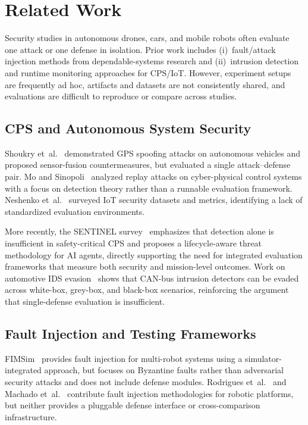 \section{Related Work} \label{sec:related}

Security studies in autonomous drones, cars, and mobile robots often
evaluate one attack or one defense in isolation.  Prior work includes
(i)~fault/attack injection methods from dependable-systems research and
(ii)~intrusion detection and runtime monitoring approaches for CPS/IoT.
However, experiment setups are frequently ad hoc, artifacts and datasets
are not consistently shared, and evaluations are difficult to reproduce
or compare across studies.

\subsection{CPS and Autonomous System Security}

Shoukry et~al.~\cite{shoukry2013} demonstrated GPS spoofing attacks on
autonomous vehicles and proposed sensor-fusion countermeasures, but
evaluated a single attack--defense pair.  Mo and Sinopoli~\cite{mo2009}
analyzed replay attacks on cyber-physical control systems with a focus on
detection theory rather than a runnable evaluation framework.
Neshenko et~al.~\cite{neshenko2019} surveyed IoT security datasets and
metrics, identifying a lack of standardized evaluation environments.

More recently, the SENTINEL survey~\cite{sentinel2026} emphasizes that
detection alone is insufficient in safety-critical CPS and proposes a
lifecycle-aware threat methodology for AI agents, directly supporting
the need for integrated evaluation frameworks that measure both security
and mission-level outcomes.  Work on automotive IDS
evasion~\cite{autoids2025} shows that CAN-bus intrusion detectors can be
evaded across white-box, grey-box, and black-box scenarios, reinforcing
the argument that single-defense evaluation is insufficient.

\subsection{Fault Injection and Testing Frameworks}

FIMSim~\cite{fimsim} provides fault injection for multi-robot systems
using a simulator-integrated approach, but focuses on Byzantine faults
rather than adversarial security attacks and does not include defense
modules.  Rodrigues et~al.~\cite{rodrigues2020} and
Machado et~al.~\cite{machado2021} contribute fault injection
methodologies for robotic platforms, but neither provides a pluggable
defense interface or cross-comparison infrastructure.


